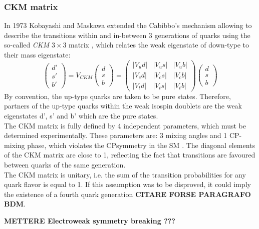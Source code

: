 \subsubsection{CKM matrix}
\label{sec:ckm}
In 1973 Kobayashi and Maskawa extended the Cabibbo's mechanism allowing to describe the transitions within and in-between 3 generations of quarks
using the so-called \textit{CKM} $3\times3$ matrix \cite{cabibbo,ckm}, which relates the weak eigenstate of down-type to their mass eigenstate:
\begin{equation}
	\begin{pmatrix}
	d' \\ 
	s' \\ 
	b' 
	\end{pmatrix} 
	= V_{CKM}
	\begin{pmatrix}
	d \\ 
	s \\ 
	b
	\end{pmatrix} 
	=
	\begin{pmatrix}
	|V_ud| & |V_us| & |V_ub| \\ 
	|V_cd| & |V_cs| & |V_cb| \\ 
	|V_td| & |V_ts|  &| V_tb|
	\end{pmatrix} 
	\begin{pmatrix}
	d \\ 
	s \\ 
	b
	\end{pmatrix} 
\end{equation}
By  convention, the up-type quarks are taken to be pure states.
Therefore, partners of the up-type quarks within the weak isospin doublets are the weak eigenstates d’, s’ and b’ which are the pure states. \\
The CKM matrix is fully defined by 4 independent parameters, which must be determined experimentally. These parameters are: 3 mixing angles and 1 CP-mixing
phase, which violates the CP\footnotemark symmetry in the SM \cite{cp_vio}.
The diagonal elements of the CKM matrix are close to 1, reflecting the fact that transitions are favoured between quarks of the same generation. \\
The CKM matrix is unitary, i.e. the sum of the transition probabilities for any quark flavor is equal to 1. If this assumption was to be disproved, 
it could imply the existence of a fourth quark generation \textbf{CITARE FORSE PARAGRAFO BDM}.

\vspace{1cm}
\textbf{METTERE Electroweak symmetry breaking ???}

